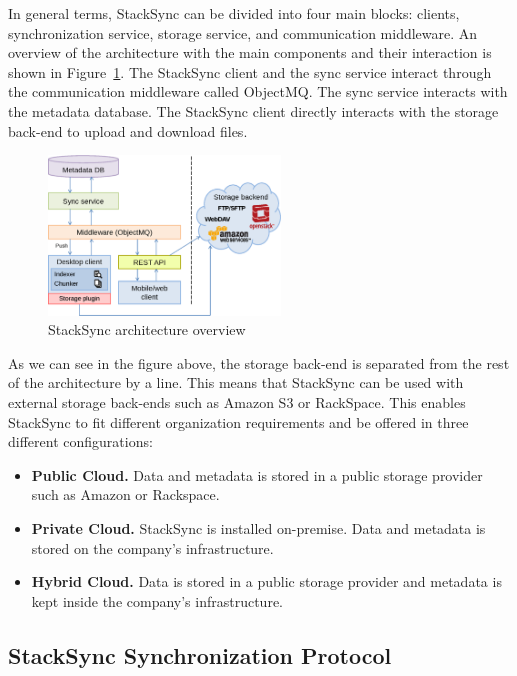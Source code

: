 In general terms, StackSync can be divided into four main blocks: clients, synchronization service, storage service, and communication middleware. An overview of the architecture with the main components and their interaction is shown in Figure~\ref{fig:architecture}. The
StackSync client and the sync service interact through the communication middleware called ObjectMQ. The sync service interacts with the
metadata database. The StackSync client directly interacts with the storage
back-end to upload and download files.

\begin{figure}[h]
\centering
\includegraphics[width=0.55\textwidth]{figures/big_picture_v2}
\caption{StackSync architecture overview}\label{fig:architecture}
\end{figure}

As we can see in the figure above, the storage back-end is separated from the rest of the architecture by a line. This means that StackSync can be used with external storage back-ends such as Amazon S3 or RackSpace. This enables StackSync to fit different organization requirements and be offered in three different configurations:

\begin{itemize}
\item \textbf{Public Cloud.} Data and metadata is stored in a public storage provider such as Amazon or Rackspace.
\item \textbf{Private Cloud.} StackSync is installed on-premise. Data and metadata is stored on the company’s infrastructure.
\item \textbf{Hybrid Cloud.} Data is stored in a public storage provider and metadata is kept inside the company’s infrastructure.
\end{itemize}

\subsection{StackSync Synchronization Protocol}

